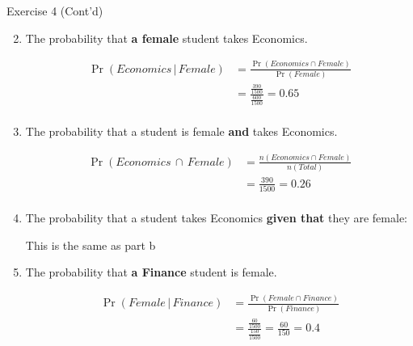 \documentclass[
  ignorenonframetext,
  aspectratio=43,
]{beamer}
\let\olditem\item
\renewcommand\item{\olditem\justifying}
\begin{document}
\begin{frame}{Exercise 4 (Cont'd)}
\protect\hypertarget{exercise-4-contd}{}
\begin{enumerate}
\setcounter{enumi}{1}
\item
  The probability that \textbf{a female} student takes Economics.

  \pause

  \[
  \begin{aligned}
  \Pr(\textit{Economics} \, | \, \textit{Female}) & = \frac{\Pr(\textit{Economics}\cap\textit{Female})}{\Pr(Female)} \\ & = \frac{\frac{390}{1500}}{\frac{600}{1500}} = 0.65 \\
  \end{aligned}
  \]
\item
  The probability that a student is female \textbf{and} takes Economics.

  \pause

  \[
  \begin{aligned}
  \Pr(\textit{Economics} \, \cap \, \textit{Female}) & = \frac{n(\textit{Economics} \cap \textit{Female})}{n(\textit{Total})} \\ & = \frac{390}{1500} = 0.26 \\
  \end{aligned}
  \]
\end{enumerate}
\end{frame}

\begin{frame}{}
\protect\hypertarget{section-1}{}
\begin{enumerate}
\setcounter{enumi}{3}
\item
  The probability that a student takes Economics \textbf{given that}
  they are female:

  \pause

  This is the same as part b
\item
  The probability that \textbf{a Finance} student is female.

  \pause

  \[
  \begin{aligned}
  \Pr(\textit{Female}\,| \,\textit{Finance}) & = \frac{\Pr(\textit{Female} \cap \textit{Finance})}{\Pr(\textit{Finance})} \\ & = \frac{\frac{60}{1500}}{\frac{150}{1500}} = \frac{60}{150}= 0.4
  \end{aligned}
  \]
\end{enumerate}
\end{frame}
\end{document}
